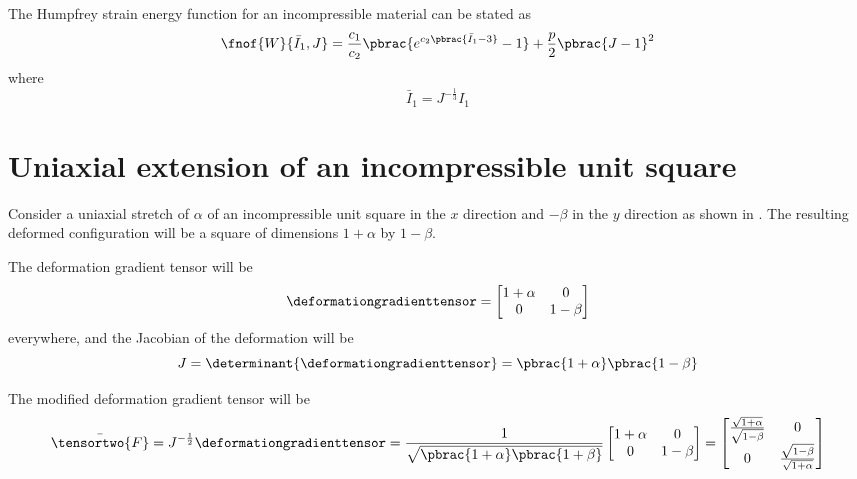 The Humpfrey strain energy function for an incompressible material can be
stated as
\begin{equation}
  \fnof{W}{\bar{I}_{1},J}=\dfrac{c_{1}}{c_{2}}\pbrac{e^{c_{2}\pbrac{\bar{I}_{1}-3}}-1}+\dfrac{p}{2}\pbrac{J-1}^{2}
\end{equation}
where
\begin{equation}
  \bar{I}_{1}=J^{-\frac{1}{3}}I_{1}
\end{equation}

\clearemptydoublepage

\section{Uniaxial extension of an incompressible unit square}

Consider a uniaxial stretch of $\alpha$ of an incompressible unit
square in the $x$ direction and $-\beta$ in the $y$ direction as shown
in . The resulting deformed
configuration will be a square of dimensions $1+\alpha$ by $1-\beta$.


The deformation gradient tensor will be
\begin{equation}
  \deformationgradienttensor= \begin{bmatrix}
    1+\alpha & 0  \\
    0 & 1-\beta
  \end{bmatrix}
\end{equation}
everywhere, and the Jacobian of the deformation will be 
\begin{equation}
  J = \determinant{\deformationgradienttensor}=\pbrac{1+\alpha}\pbrac{1-\beta}
\end{equation}

The modified deformation gradient tensor will be
\begin{equation}
  \bar{\tensortwo{F}}=J^{-\frac{1}{2}}\deformationgradienttensor=\frac{1}{\sqrt{\pbrac{1+\alpha}\pbrac{1+\beta}}}\begin{bmatrix}
    1+\alpha & 0  \\
    0 & 1-\beta
  \end{bmatrix}=\begin{bmatrix}
    \frac{\sqrt{1+\alpha}}{\sqrt{1-\beta}} & 0  \\
    0 & \frac{\sqrt{1-\beta}}{\sqrt{1+\alpha}}
  \end{bmatrix}
\end{equation}

